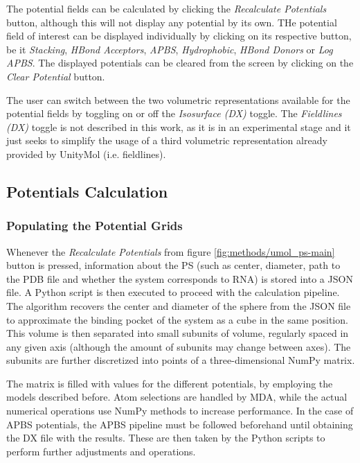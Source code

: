     The potential fields can be calculated by clicking the \textit{Recalculate Potentials} button, although this will not display any potential by its own. THe potential field of interest can be displayed individually by clicking on its respective button, be it \textit{Stacking}, \textit{HBond Acceptors}, \textit{APBS}, \textit{Hydrophobic}, \textit{HBond Donors} or \textit{Log APBS}. The displayed potentials can be cleared from the screen by clicking on the \textit{Clear Potential} button.

    The user can switch between the two volumetric representations available for the potential fields by toggling on or off the \textit{Isosurface (DX)} toggle. The \textit{Fieldlines (DX)} toggle is not described in this work, as it is in an experimental stage and it just seeks to simplify the usage of a third volumetric representation already provided by UnityMol (i.e. fieldlines).

  \subsection{Potentials Calculation}
    \subsubsection{Populating the Potential Grids}
      Whenever the \textit{Recalculate Potentials} from figure \ref{fig:methods/umol_ps-main} button is pressed, information about the PS (such as center, diameter, path to the PDB file and whether the system corresponds to RNA) is stored into a JSON file. A Python script is then executed to proceed with the calculation pipeline. The algorithm recovers the center and diameter of the sphere from the JSON file to approximate the binding pocket of the system as a cube in the same position. This volume is then separated into small subunits of volume, regularly spaced in any given axis (although the amount of subunits may change between axes). The subunits are further discretized into points of a three-dimensional NumPy matrix.

      The matrix is filled with values for the different potentials, by employing the models described before. Atom selections are handled by MDA, while the actual numerical operations use NumPy methods to increase performance. In the case of APBS potentials, the APBS pipeline must be followed beforehand until obtaining the DX file with the results. These are then taken by the Python scripts to perform further adjustments and operations.

